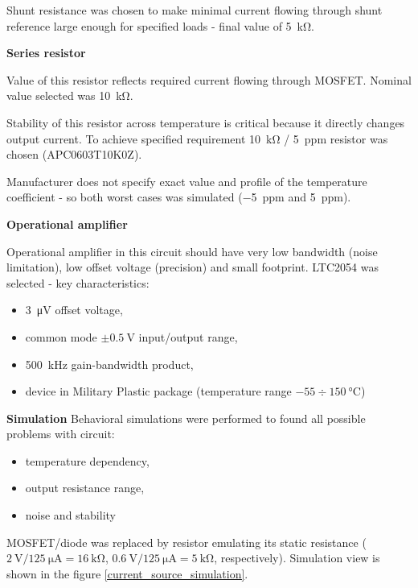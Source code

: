         Shunt resistance was chosen to make minimal current flowing through shunt reference large enough for specified loads - final value of \SI{5}{\kilo\ohm}.

        \bigskip \textbf{Series resistor}

        Value of this resistor reflects required current flowing through MOSFET. Nominal value selected was \SI{10}{\kilo\ohm}.

        Stability of this resistor across temperature is critical because it directly changes output current. To achieve specified requirement \SI{10}{\kilo\ohm} / \SI{5}{ppm} resistor was chosen (APC0603T10K0Z).

        Manufacturer does not specify exact value and profile of the temperature coefficient - so both worst cases was simulated (\SI{-5}{ppm} and \SI{5}{ppm}).

        \bigskip \textbf{Operational amplifier}

        Operational amplifier in this circuit should have very low bandwidth (noise limitation), low offset voltage (precision) and small footprint. LTC2054 was selected - key characteristics:
        \begin{itemize}
            \item \SI{3}{\micro\volt} offset voltage,
            \item common mode $\pm \SI{0.5}{\volt}$ input/output range,
            \item \SI{500}{\kilo\hertz} gain-bandwidth product,
            \item device in Military Plastic package (temperature range $-55 \div \SI{150}{\degreeCelsius}$)
        \end{itemize}

        \bigskip \textbf{Simulation}
        Behavioral simulations were performed to found all possible problems with circuit:
        \begin{itemize}
            \item temperature dependency,
            \item output resistance range,
            \item noise and stability
        \end{itemize}

        MOSFET/diode was replaced by resistor emulating its static resistance ($\SI{2}{\volt}/\SI{125}{\micro\ampere} = \SI{16}{\kilo\ohm}$, $\SI{0.6}{\volt}/\SI{125}{\micro\ampere} = \SI{5}{\kilo\ohm}$, respectively). Simulation view is shown in the figure \ref{current_source_simulation}.


